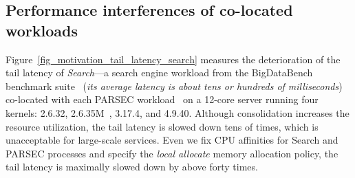 \documentclass[pageno]{jpaper}
\begin{document}
\subsection{Performance interferences of co-located workloads}\label{section_motivation_isolation}
Figure~\ref{fig_motivation_tail_latency_search} measures the deterioration of the tail latency of \emph{Search}---a search engine workload from the BigDataBench benchmark suite~\cite{Wang:2014:BigDataBench} (\emph{its average latency is about tens or hundreds of milliseconds}) co-located with each PARSEC workload~\cite{PARSEC_Source_code} on a 12-core server running four kernels: 2.6.32, 2.6.35M~\cite{Boyd-Wickizer:2010:MOSBench}, 3.17.4, and 4.9.40.  Although consolidation increases the resource utilization, the tail latency is slowed down tens of times, which is unacceptable for large-scale services. Even we fix  CPU affinities for Search and PARSEC processes and specify the \emph{local allocate} memory allocation policy, the tail latency is maximally slowed down by above forty times. 
\end{document}
